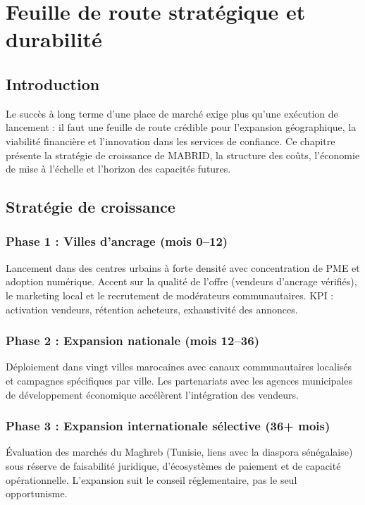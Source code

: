 \chapter{Feuille de route stratégique et durabilité}
\label{ch:roadmap}

\section{Introduction}

Le succès à long terme d'une place de marché exige plus qu'une exécution de lancement : il faut une feuille de route crédible pour l'expansion géographique, la viabilité financière et l'innovation dans les services de confiance. Ce chapitre présente la stratégie de croissance de MABRID, la structure des coûts, l'économie de mise à l'échelle et l'horizon des capacités futures.

\section{Stratégie de croissance}

\subsection{Phase 1 : Villes d'ancrage (mois 0--12)}

Lancement dans des centres urbains à forte densité avec concentration de PME et adoption numérique. Accent sur la qualité de l'offre (vendeurs d'ancrage vérifiés), le marketing local et le recrutement de modérateurs communautaires. KPI : activation vendeurs, rétention acheteurs, exhaustivité des annonces.

\subsection{Phase 2 : Expansion nationale (mois 12--36)}

Déploiement dans vingt villes marocaines avec canaux communautaires localisés et campagnes spécifiques par ville. Les partenariats avec les agences municipales de développement économique accélèrent l'intégration des vendeurs.

\subsection{Phase 3 : Expansion internationale sélective (36+ mois)}

Évaluation des marchés du Maghreb (Tunisie, liens avec la diaspora sénégalaise) sous réserve de faisabilité juridique, d'écosystèmes de paiement et de capacité opérationnelle. L'expansion suit le conseil réglementaire, pas le seul opportunisme.

